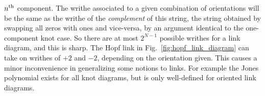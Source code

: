         $n^{\small\textrm{th}}$ component. The writhe associated to a given
        combination of orientations will be the same as the writhe of the
        \textit{complement} of this string, the string obtained by swapping all
        zeros with ones and vice-versa, by an argument identical to the
        one-component knot case. So there are at most $2^{N-1}$ possible writhes
        for a link diagram, and this is sharp. The Hopf link in
        Fig.~\ref{fig:hopf_link_diagram} can take on writhes of $+2$ and $-2$,
        depending on the orientation given. This causes a minor inconvenience
        in generalizing some notions to links. For example the Jones
        polynomial exists for all knot diagrams, but is only
        well-defined for oriented link diagrams.
